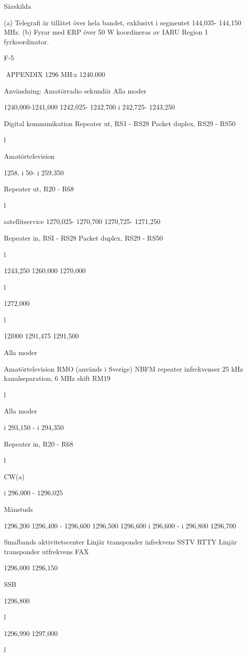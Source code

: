 Särskilda

(a) Telegrafi är tillåtet över hela bandet, exklusivt i segmentet 144,035- 144,150 MHz.
(b) Fyrar med ERP över 50 W koordineras av IARU Region 1 fyrkoordinator.

F-5

APPENDIX
1296 MH:z
1240.000

Användning: Amatörradio sekundär
Alla moder

1240,000-1241,000
1242,025- 1242,700
i 242,725- 1243,250

Digital kommunikation
Repeater ut, RS1 - RS28
Packet duplex, RS29 - RS50

l

Amatörtelevision

1258, i 50- i 259,350

Repeater ut, R20 - R68

l

satellitservice
1270,025- 1270,700
1270,725- 1271,250

Repeater in, RSI - RS28
Packet duplex, RS29 - RS50

l

1243,250
1260,000
1270,000

l

1272,000

l

12l000
1291,475
1291,500

Alla moder

Amatörtelevision
RMO
(används i Sverige)
NBFM repeater infrekvenser
25 kHz kanalseparation, 6 MHz skift
RM19

l

Alla moder

i 293,150 - i 294,350

Repeater in, R20 - R68

l

CW(a)

i 296,000 - 1296,025

Månstuds

1296,200
1296,400 - 1296,600
1296,500
1296,600
i 296,600 - i 296,800
1296,700

Smalbands aktivitetscenter
Linjär transponder infrekvens
SSTV
RTTY
Linjär transponder utfrekvens
FAX

1296,000
1296,150

SSB

1296,800

l

1296,990
1297,000

l

